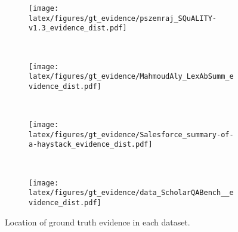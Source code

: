 \begin{figure*}[t]
    \centering
    \begin{subfigure}[t]{0.23\textwidth}
    \centering
    \texttt{[image: latex/figures/gt\_evidence/pszemraj\_SQuALITY-v1.3\_evidence\_dist.pdf]}
    
    \caption{\sqa{}}
    \end{subfigure}
    ~
    \begin{subfigure}[t]{0.23\textwidth}
        \centering\texttt{[image: latex/figures/gt\_evidence/MahmoudAly\_LexAbSumm\_evidence\_dist.pdf]}
        
    \caption{\las{}}
    \end{subfigure}
    ~
    \begin{subfigure}[t]{0.23\textwidth}
        \centering\texttt{[image: latex/figures/gt\_evidence/Salesforce\_summary-of-a-haystack\_evidence\_dist.pdf]}
        
    \caption{\smh{}}
    \end{subfigure}
    ~
    \begin{subfigure}[t]{0.23\textwidth}
        \centering\texttt{[image: latex/figures/gt\_evidence/data\_ScholarQABench\_\_evidence\_dist.pdf]}
        
    \caption{\ops{}}
    \end{subfigure}
\caption{Location of ground truth evidence in each dataset.}
\label{fig:gt_distribution}
\end{figure*}%
